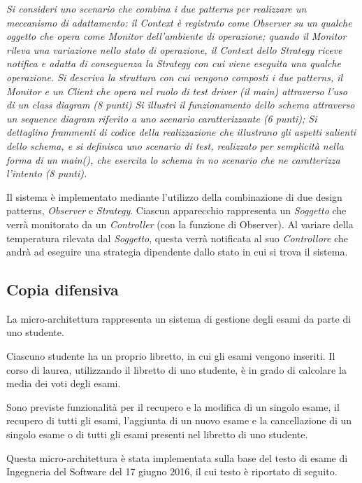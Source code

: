 \emph{Si consideri uno scenario che combina i due patterns per realizzare un meccanismo di adattamento:
il Context è registrato come Observer su un qualche oggetto che opera come Monitor dell'ambiente di operazione; quando il Monitor rileva una variazione nello stato di operazione, il Context dello Strategy riceve notifica e adatta di conseguenza la Strategy con cui viene eseguita una qualche operazione.
Si descriva la struttura con cui vengono composti i due patterns, il Monitor e un Client che opera nel ruolo di test driver (il main) attraverso l'uso di un class diagram (8 punti)
Si illustri il funzionamento dello schema attraverso un sequence diagram riferito a uno scenario caratterizzante (6 punti);
Si dettaglino frammenti di codice della realizzazione che illustrano gli aspetti salienti dello schema, e si definisca uno scenario di test, realizzato per semplicità nella forma di un main(),  che esercita lo schema in no scenario che ne caratterizza l'intento (8 punti).}

\vspace{0.5cm}

Il sistema è implementato mediante l’utilizzo della combinazione di due design patterns, \emph{Observer} e \emph{Strategy}. Ciascun apparecchio rappresenta un \emph{Soggetto} che verrà monitorato da un \emph{Controller} (con la funzione di Observer). Al variare della temperatura rilevata dal \emph{Soggetto}, questa verrà notificata al suo \emph{Controllore} che andrà ad eseguire una strategia dipendente dallo stato in cui si trova il sistema.


\subsection{Copia difensiva}

La micro-architettura rappresenta un sistema di gestione degli esami da parte di uno studente. 

Ciascuno studente  ha un proprio libretto, in cui gli esami vengono inseriti. Il corso di laurea, utilizzando il libretto di uno studente, è in grado di calcolare la media dei voti degli esami. 

Sono previste funzionalità per il recupero e la modifica di un singolo esame, il recupero di tutti gli esami, l'aggiunta di un nuovo esame e la cancellazione di un singolo esame o di tutti gli esami presenti nel libretto di uno studente.

Questa micro-architettura è stata implementata sulla base del testo di esame di Ingegneria del Software del 17 giugno 2016, il cui testo è riportato di seguito.

